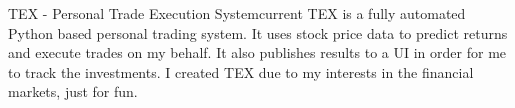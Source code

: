 
\begin{projects}
	\project
	{TEX - Personal Trade Execution System}{current}
  {TEX is a fully automated Python based personal trading system. It uses stock
  price data to predict returns and execute trades on my behalf. It also publishes
  results to a UI in order for me to track the investments. I created TEX due to
  my interests in the financial markets, just for fun.}
\end{projects}

